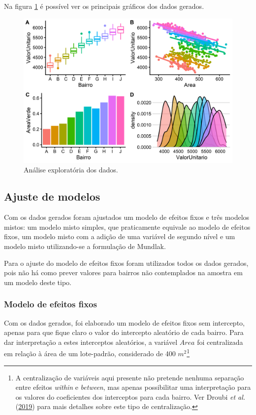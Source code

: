 \documentclass[
  a4paper, 11pt]{article}
\begin{document}
Na figura \ref{fig:exploratoria} é possível ver os principais gráficos
dos dados gerados.

\begin{figure}[H]

{\centering \includegraphics[width=1\linewidth]{images/exploratoria-1} 

}

\caption{Análise exploratória dos dados.}\label{fig:exploratoria}
\end{figure}

\hypertarget{ajuste-de-modelos}{%
\subsection{Ajuste de modelos}\label{ajuste-de-modelos}}

Com os dados gerados foram ajustados um modelo de efeitos fixos e três
modelos mistos: um modelo misto simples, que praticamente equivale ao
modelo de efeitos fixos, um modelo misto com a adição de uma variável de
segundo nível e um modelo misto utilizando-se a formulação de Mundlak.

Para o ajuste do modelo de efeitos fixos foram utilizados todos os dados
gerados, pois não há como prever valores para bairros não contemplados
na amostra em um modelo deste tipo.

\hypertarget{modelo-de-efeitos-fixos}{%
\subsubsection{Modelo de efeitos fixos}\label{modelo-de-efeitos-fixos}}

Com os dados gerados, foi elaborado um modelo de efeitos fixos sem
intercepto, apenas para que fique claro o valor do intercepto aleatório
de cada bairro. Para dar interpretação a estes interceptos aleatórios, a
variável \(Area\) foi centralizada em relação à área de um lote-padrão,
considerado de 400 \(m^2\)\footnote{A centralização de variáveis aqui
  presente não pretende nenhuma separação entre efeitos \emph{within} e
  \emph{between}, mas apenas possibilitar uma interpretação para os
  valores do coeficientes dos interceptos para cada bairro. Ver Droubi
  \emph{et al.} (\protect\hyperlink{ref-droubi2019}{2019}) para mais
  detalhes sobre este tipo de centralização.}
\end{document}
